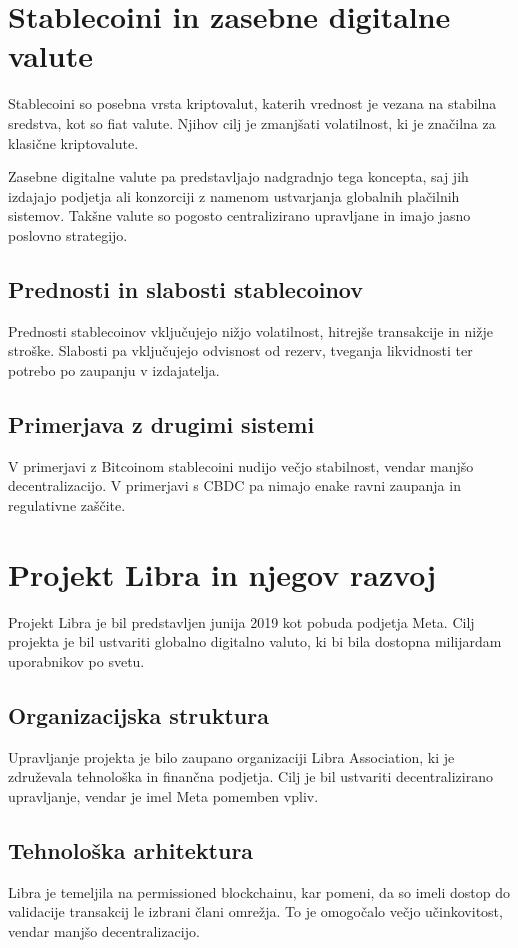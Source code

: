 \documentclass[12pt,a4paper]{article}
\begin{document}
\section{Stablecoini in zasebne digitalne valute}

Stablecoini so posebna vrsta kriptovalut, katerih vrednost je vezana na stabilna sredstva, kot so fiat valute. Njihov cilj je zmanjšati volatilnost, ki je značilna za klasične kriptovalute.

Zasebne digitalne valute pa predstavljajo nadgradnjo tega koncepta, saj jih izdajajo podjetja ali konzorciji z namenom ustvarjanja globalnih plačilnih sistemov. Takšne valute so pogosto centralizirano upravljane in imajo jasno poslovno strategijo.

\subsection{Prednosti in slabosti stablecoinov}
Prednosti stablecoinov vključujejo nižjo volatilnost, hitrejše transakcije in nižje stroške. Slabosti pa vključujejo odvisnost od rezerv, tveganja likvidnosti ter potrebo po zaupanju v izdajatelja.

\subsection{Primerjava z drugimi sistemi}
V primerjavi z Bitcoinom stablecoini nudijo večjo stabilnost, vendar manjšo decentralizacijo. V primerjavi s CBDC pa nimajo enake ravni zaupanja in regulativne zaščite.

\section{Projekt Libra in njegov razvoj}

Projekt Libra je bil predstavljen junija 2019 kot pobuda podjetja Meta. Cilj projekta je bil ustvariti globalno digitalno valuto, ki bi bila dostopna milijardam uporabnikov po svetu.

\subsection{Organizacijska struktura}
Upravljanje projekta je bilo zaupano organizaciji Libra Association, ki je združevala tehnološka in finančna podjetja. Cilj je bil ustvariti decentralizirano upravljanje, vendar je imel Meta pomemben vpliv.

\subsection{Tehnološka arhitektura}
Libra je temeljila na permissioned blockchainu, kar pomeni, da so imeli dostop do validacije transakcij le izbrani člani omrežja. To je omogočalo večjo učinkovitost, vendar manjšo decentralizacijo.
\end{document}
